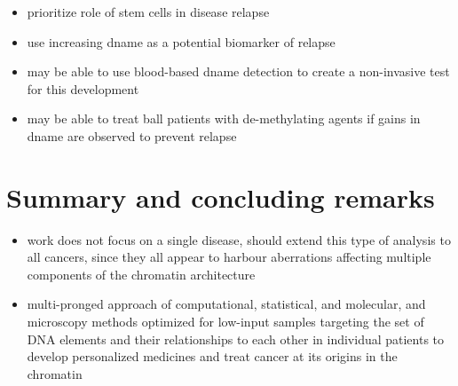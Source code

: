 \begin{itemize}
  \item prioritize role of stem cells in disease relapse
  \item use increasing \gls{dname} as a potential biomarker of relapse
  \item may be able to use blood-based \gls{dname} detection to create a non-invasive test for this development
  \item may be able to treat \gls{ball} patients with de-methylating agents if gains in \gls{dname} are observed to prevent relapse
\end{itemize}

\section{Summary and concluding remarks}

\begin{itemize}
  \item work does not focus on a single disease, should extend this type of analysis to all cancers, since they all appear to harbour aberrations affecting multiple components of the chromatin architecture
  \item multi-pronged approach of computational, statistical, and molecular, and microscopy methods optimized for low-input samples targeting the set of DNA elements and their relationships to each other in individual patients to develop personalized medicines and treat cancer at its origins in the chromatin
\end{itemize}
